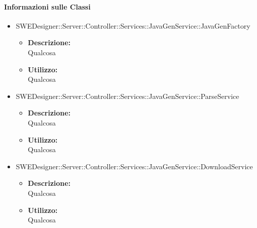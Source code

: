 		\paragraph{Informazioni sulle Classi}
		\begin{itemize}
			\item SWEDesigner::Server::Controller::Services::JavaGenService::JavaGenFactory
			\begin{itemize}
				\item \textbf{Descrizione: }\\
				Qualcosa
				\item \textbf{Utilizzo: }\\
				Qualcosa
			\end{itemize}
			\item SWEDesigner::Server::Controller::Services::JavaGenService::ParseService
			\begin{itemize}
				\item \textbf{Descrizione: }\\
				Qualcosa
				\item \textbf{Utilizzo: }\\
				Qualcosa
			\end{itemize}
			\item SWEDesigner::Server::Controller::Services::JavaGenService::DownloadService
			\begin{itemize}
				\item \textbf{Descrizione: }\\
				Qualcosa
				\item \textbf{Utilizzo: }\\
				Qualcosa
			\end{itemize}
		\end{itemize}
		
